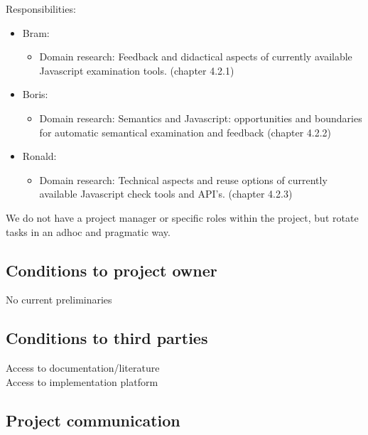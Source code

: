 \documentclass{article}
\begin{document}
Responsibilities:
\begin{itemize}
  \item Bram: 
    \begin{itemize}
      \item Domain research: Feedback and didactical aspects of currently available Javascript examination tools. (chapter 4.2.1)
    \end{itemize}
  \item Boris:
    \begin{itemize}
      \item Domain research: Semantics and Javascript: opportunities and boundaries for automatic semantical examination and feedback (chapter 4.2.2)
    \end{itemize}
  \item Ronald:
    \begin{itemize}
      \item Domain research: Technical aspects and reuse options of currently available Javascript check tools and API's. (chapter 4.2.3)
    \end{itemize}
\end{itemize}

We do not have a project manager or specific roles within the project, but rotate tasks in an adhoc and pragmatic way.

\subsection{Conditions to project owner}

No current preliminaries

\subsection{Conditions to third parties}

Access to documentation/literature\\
Access to implementation platform

\subsection{Project communication}
\end{document}
